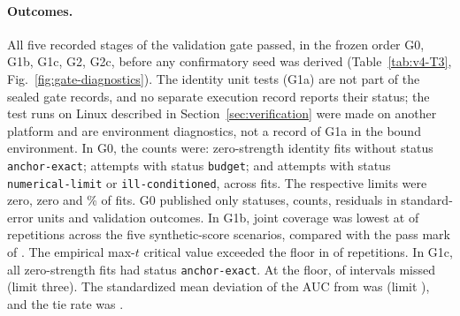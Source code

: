 \paragraph{Outcomes.}
All five recorded stages of the validation gate passed, in the frozen order G0, G1b, G1c, G2, G2c, before any confirmatory seed was derived (Table~\ref{tab:v4-T3}, Fig.~\ref{fig:gate-diagnostics}). The identity unit tests (G1a) are not part of the sealed gate records, and no separate execution record reports their status; the test runs on Linux described in Section~\ref{sec:verification} were made on another platform and are environment diagnostics, not a record of G1a in the bound environment.
In G0, the counts were:  zero-strength identity fits without status \texttt{anchor-exact};  attempts with status \texttt{budget}; and  attempts with status \texttt{numerical-limit} or \texttt{ill-conditioned}, across  fits. The respective limits were zero, zero and \% of fits. G0 published only statuses, counts, residuals in standard-error units and validation outcomes.
In G1b, joint coverage was lowest at  of  repetitions across the five synthetic-score scenarios, compared with the pass mark of . The empirical max-$t$ critical value exceeded the  floor in  of  repetitions.
In G1c, all  zero-strength fits had status \texttt{anchor-exact}. At the  floor,  of  intervals missed  (limit three). The standardized mean deviation of the AUC from  was  (limit ), and the tie rate was .
